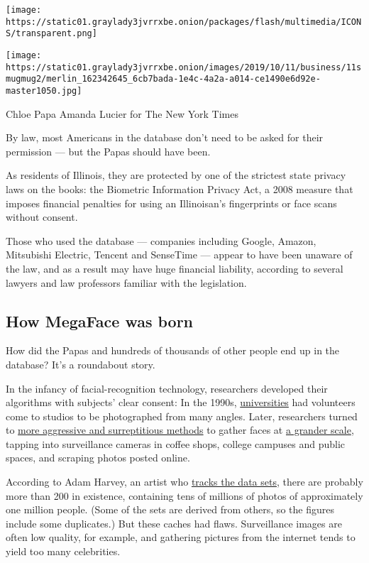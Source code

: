 \texttt{[image: https://static01.graylady3jvrrxbe.onion/packages/flash/multimedia/ICONS/transparent.png]}

\texttt{[image: https://static01.graylady3jvrrxbe.onion/images/2019/10/11/business/11smugmug2/merlin\_162342645\_6cb7bada-1e4c-4a2a-a014-ce1490e6d92e-master1050.jpg]}

Chloe Papa Amanda Lucier for The New York Times

By law, most Americans in the database don't need to be asked for their
permission --- but the Papas should have been.

As residents of Illinois, they are protected by one of the strictest
state privacy laws on the books: the Biometric Information Privacy Act,
a 2008 measure that imposes financial penalties for using an
Illinoisan's fingerprints or face scans without consent.

Those who used the database --- companies including Google, Amazon,
Mitsubishi Electric, Tencent and SenseTime --- appear to have been
unaware of the law, and as a result may have huge financial liability,
according to several lawyers and law professors familiar with the
legislation.

\hypertarget{how-megaface-was-born}{%
\subsection{How MegaFace was born}\label{how-megaface-was-born}}

How did the Papas and hundreds of thousands of other people end up in
the database? It's a roundabout story.

In the infancy of facial-recognition technology, researchers developed
their algorithms with subjects' clear consent: In the 1990s,
\href{https://www.nist.gov/programs-projects/face-recognition-technology-feret}{universities}
had volunteers come to studios to be photographed from many angles.
Later, researchers turned to
\href{https://www.nytimes3xbfgragh.onion/2019/07/13/technology/databases-faces-facial-recognition-technology.html}{more
aggressive and surreptitious methods} to gather faces at
\href{https://www.nbcnews.com/tech/internet/facial-recognition-s-dirty-little-secret-millions-online-photos-scraped-n981921}{a
grander scale}, tapping into surveillance cameras in coffee shops,
college campuses and public spaces, and scraping photos posted online.

According to Adam Harvey, an artist who
\href{https://megapixels.cc/}{tracks the data sets}, there are probably
more than 200 in existence, containing tens of millions of photos of
approximately one million people. (Some of the sets are derived from
others, so the figures include some duplicates.) But these caches had
flaws. Surveillance images are often low quality, for example, and
gathering pictures from the internet tends to yield too many
celebrities.

